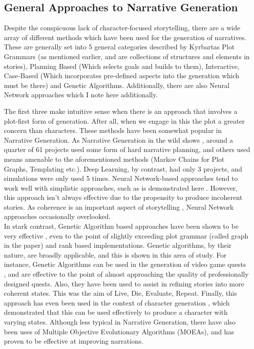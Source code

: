 \documentclass[12pt]{article}
\begin{document}
\subsection{General Approaches to Narrative Generation}
Despite the conspicuous lack of character-focused storytelling, there are a wide array of different methods which have been used for the generation of narratives. These are generally set into 5 general categories described by Kyrbartas\cite{KybartasGenerationTechniques} \: Plot Grammars (as mentioned earlier, and are collections of structures and elements in stories), Planning Based (Which selects goals and builds to them), Interactive, Case-Based (Which incorporates pre-defined aspects into the generation which must be there) and Genetic Algorithms. Additionally, there are also Neural Network approaches which I note here additionally. 

The first three make intuitive sense when there is an approach that involves a plot-first form of generation. After all, when we engage in this the plot a greater concern than characters. These methods have been somewhat popular in Narrative Generation. As Narrative Generation in the wild shows \cite{van-stegeren-theune-2019-narrative}, around a quarter of 61 projects used some form of hard narrative planning, and others used means amenable to the aforementioned methods (Markov Chains for Plot Graphs, Templating etc.). Deep Learning, by contrast, had only 3 projects, and simulations were only used 5 times. Neural Network-based approaches tend to work well with simplistic approaches, such as is demonstrated here \cite{NeuralNetworkOne}. However, this approach isn't always effective due to the propensity to produce incoherent stories. As coherence is an important aspect of storytelling \cite{sagarkar-etal-2018-quality}, Neural Network approaches occasionally overlooked. \\

In stark contrast, Genetic Algorithm based approaches have been shown to be very effective \cite{mcintyre-lapata-2010-plot}, even to the point of slightly exceeding plot grammar (called graph in the paper) and rank based implementations. Genetic algorithms, by their nature, are broadly applicable, and this is shown in this area of study. For instance, Genetic Algorithms can be used in the generation of video game quests \cite{questgeneration}, and are effective to the point of almost approaching the quality of professionally designed quests. Also, they have been used to assist in refining stories into more coherent states. This was the aim of Live, Die, Evaluate, Repeat\cite{Riegl2018LiveDE}. Finally, this approach has even been used in the context of character generation \cite{charactergeneration}, which demonstrated that this can be used effectively to produce a character with varying states. Although less typical in Narrative Generation, there have also been uses of Multiple Objective Evolutionary Algorithms (MOEAs)\cite{MOEANarrative}, and has proven to be effective at improving narrations.
\end{document}
